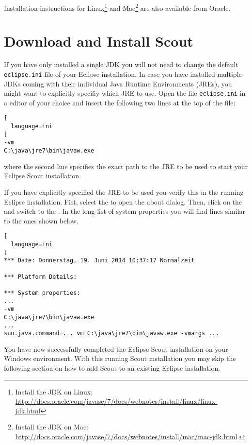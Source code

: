 \documentclass[a4paper,10pt,twoside]{book}
\begin{document}
Installation instructions for Linux\footnote{
Install the JDK on Linux: \url{http://docs.oracle.com/javase/7/docs/webnotes/install/linux/linux-jdk.html}
}
and Mac\footnote{
Install the JDK on Mac: \url{http://docs.oracle.com/javase/7/docs/webnotes/install/mac/mac-jdk.html}.
}
are also available from Oracle.

\section{Download and Install Scout}



If you have only installed a single JDK you will not need to change the default \texttt{eclipse.ini} file of your Eclipse installation.
In case you have installed multiple JDKs coming with their individual Java Runtime Environments (JREs), you might want to explicitly specifiy which JRE to use.
Open the file \texttt{eclipse.ini} in a editor of your choice and insert the following two lines at the top of the file:

\begin{lstlisting}[
  language=ini
]
-vm
C:\java\jre7\bin\javaw.exe
\end{lstlisting}

where the second line specifies the exact path to the JRE to be used to start your Eclipse Scout installation.

If you have explicitly specified the JRE to be used you verify this in the running Eclipse installation.
Fist, select the  to open the about dialog.
Then, click on the  and switch to the .
In the long list of system properties you will find lines similar to the ones shown below.

\begin{lstlisting}[
  language=ini
]
*** Date: Donnerstag, 19. Juni 2014 10:37:17 Normalzeit

*** Platform Details:

*** System properties:
...
-vm
C:\java\jre7\bin\javaw.exe
...
sun.java.command=... vm C:\java\jre7\bin\javaw.exe -vmargs ...
\end{lstlisting}

You have now successfully completed the Eclipse Scout installation on your Windows environment.
With this running Scout installation you may skip the following section on how to add Scout to an existing Eclipse installation.
\end{document}
